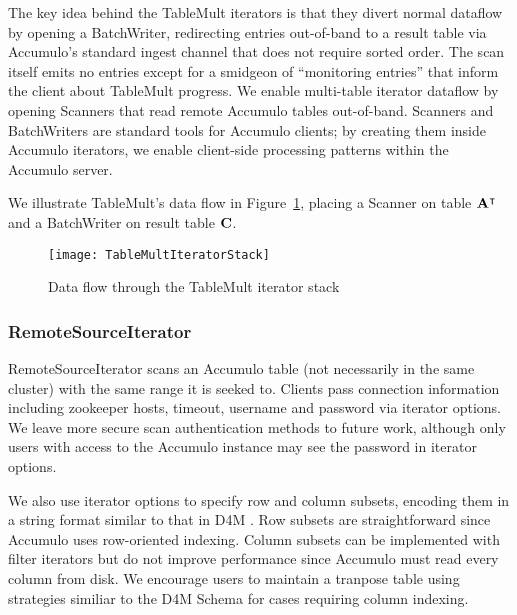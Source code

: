 The key idea behind the TableMult iterators is that they divert normal dataflow by opening a BatchWriter,
redirecting entries out-of-band to a result table via %
Accumulo's standard ingest channel that does not require sorted order. 
The scan itself emits no entries except for a smidgeon of ``monitoring entries'' 
that inform the client about TableMult progress.
We enable multi-table iterator dataflow by opening Scanners 
that read remote Accumulo tables out-of-band.
Scanners and BatchWriters are standard tools for Accumulo clients; 
by creating them inside Accumulo iterators, we enable client-side processing patterns
within the Accumulo server.

We illustrate TableMult's data flow in Figure~\ref{fIteratorStackSpGEMM},
placing a Scanner on table $\mathbf{A^{\intercal}}$
and a BatchWriter on result table $\mathbf{C}$.

\begin{figure}[htb]
\centering
\texttt{[image: TableMultIteratorStack]}
\caption{Data flow through the TableMult iterator stack}
\label{fIteratorStackSpGEMM}
\end{figure}

\subsubsection{RemoteSourceIterator}
RemoteSourceIterator scans an Accumulo table
(not necessarily in the same cluster) with the same range it is seeked to.
Clients pass connection information including zookeeper hosts, timeout,
username and password via iterator options. %
We leave more secure scan authentication methods to future work,
although only users with access to the Accumulo instance may see the password in iterator options.

We also use iterator options to specify row and column subsets, 
encoding them in a string format similar to that in D4M \cite{kepner2012dynamic}.
Row subsets are straightforward since Accumulo uses row-oriented indexing.
Column subsets can be implemented with filter iterators
but do not improve performance since Accumulo must read every column from disk.
We encourage users to maintain a tranpose table
using strategies similiar to the D4M Schema \cite{kepner2013d4m}
for cases requiring column indexing.

